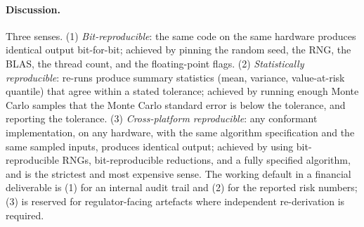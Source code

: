 \paragraph{Discussion.}
Three senses. (1) \emph{Bit-reproducible}: the same code on the
same hardware produces identical output bit-for-bit; achieved by
pinning the random seed, the RNG, the BLAS, the thread count, and
the floating-point flags. (2) \emph{Statistically reproducible}:
re-runs produce summary statistics (mean, variance, value-at-risk
quantile) that agree within a stated tolerance; achieved by
running enough Monte Carlo samples that the Monte Carlo standard
error is below the tolerance, and reporting the tolerance.
(3) \emph{Cross-platform reproducible}: any conformant
implementation, on any hardware, with the same algorithm
specification and the same sampled inputs, produces identical
output; achieved by using bit-reproducible RNGs, bit-reproducible
reductions, and a fully specified algorithm, and is the strictest
and most expensive sense. The working default in a financial
deliverable is (1) for an internal audit trail and (2) for the
reported risk numbers; (3) is reserved for regulator-facing
artefacts where independent re-derivation is required.
